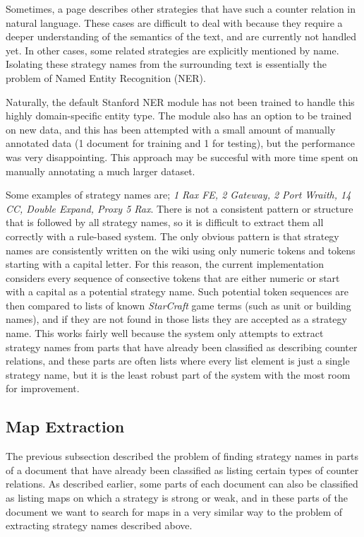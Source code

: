\documentclass[]{article}
\begin{document}
Sometimes, a page describes other strategies that have such a counter relation in natural language. These cases are difficult to deal with because they require a deeper understanding of the semantics of the text, and are currently not handled yet. In other cases, some related strategies are explicitly mentioned by name. Isolating these strategy names from the surrounding text is essentially the problem of Named Entity Recognition (NER). 

Naturally, the default Stanford NER module \cite{StanfordNER} has not been trained to handle this highly domain-specific entity type. The module also has an option to be trained on new data, and this has been attempted with a small amount of manually annotated data (1 document for training and 1 for testing), but the performance was very disappointing. This approach may be succesful with more time spent on manually annotating a much larger dataset.

Some examples of strategy names are; \emph{1 Rax FE, 2 Gateway, 2 Port Wraith, 14 CC, Double Expand, Proxy 5 Rax}. There is not a consistent pattern or structure that is followed by all strategy names, so it is difficult to extract them all correctly with a rule-based system. The only obvious pattern is that strategy names are consistently written on the wiki using only numeric tokens and tokens starting with a capital letter. For this reason, the current implementation considers every sequence of consective tokens that are either numeric or start with a capital as a potential strategy name. Such potential token sequences are then compared to lists of known \emph{StarCraft} game terms (such as unit or building names), and if they are not found in those lists they are accepted as a strategy name. This works fairly well because the system only attempts to extract strategy names from parts that have already been classified as describing counter relations, and these parts are often lists where every list element is just a single strategy name, but it is the least robust part of the system with the most room for improvement.

\subsection{Map Extraction}
The previous subsection described the problem of finding strategy names in parts of a document that have already been classified as listing certain types of counter relations. As described earlier, some parts of each document can also be classified as listing maps on which a strategy is strong or weak, and in these parts of the document we want to search for maps in a very similar way to the problem of extracting strategy names described above.
\end{document}
